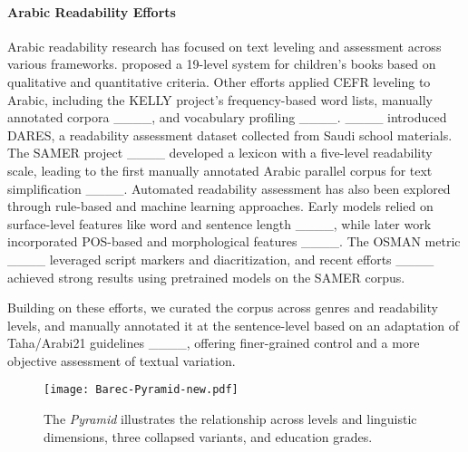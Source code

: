 \paragraph{Arabic Readability Efforts}
Arabic readability research has focused on text leveling and assessment across various frameworks.  proposed a 19-level system for children's books based on qualitative and quantitative criteria. Other efforts applied CEFR leveling to Arabic, including the KELLY project’s frequency-based word lists, manually annotated corpora ____, and vocabulary profiling ____.
____ introduced DARES, a readability assessment dataset collected from Saudi school materials.
The SAMER project ____ developed a lexicon with a five-level readability scale, leading to the first manually annotated Arabic parallel corpus for text simplification ____.
%
Automated readability assessment has also been explored through rule-based and machine learning approaches. Early models relied on surface-level features like word and sentence length ____, while later work incorporated POS-based and morphological features ____. The OSMAN metric ____ leveraged script markers and diacritization, and recent efforts ____ achieved strong results using pretrained models on the SAMER corpus. 

Building on these efforts, we curated the {\barec} corpus across genres and readability levels, and manually annotated it at the sentence-level based on an adaptation of Taha/Arabi21 guidelines ____, offering finer-grained control and a more objective assessment of textual variation.





\begin{figure*}[t]
\centering
 \texttt{[image: Barec-Pyramid-new.pdf]}
    \caption{ The {\barec} \textit{Pyramid}  illustrates the relationship across {\barec} levels and linguistic dimensions, three collapsed variants, and education grades.}
\label{fig:barec-pyramid}
\end{figure*}


%